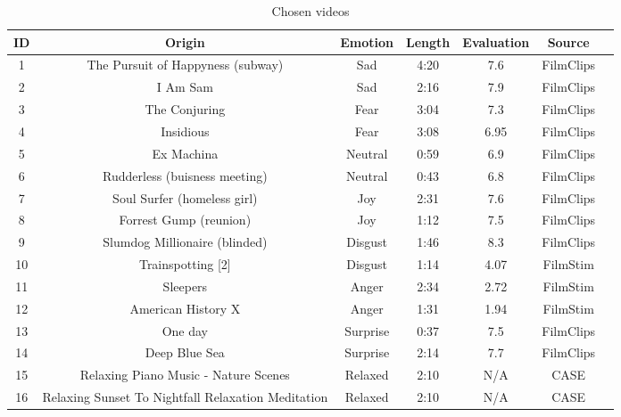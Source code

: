 \begin{table}[]
    \centering
    \begin{tabular}{|c|c|c|c|c|c|c|}
        \hline
        ID & Origin & Emotion & Length & Evaluation & Source\\ \hline
        1 & The Pursuit of Happyness (subway) & Sad & 4:20 & 7.6  & FilmClips \cite{FilmClips} \\ \hline
        2 & I Am Sam & Sad & 2:16 & 7.9  & FilmClips \cite{FilmClips}\\ \hline
        3 & The Conjuring & Fear & 3:04 & 7.3  & FilmClips \cite{FilmClips}  \\ \hline
        4 & Insidious & Fear & 3:08 & 6.95  & FilmClips \cite{FilmClips} \\ \hline
        5 & Ex Machina & Neutral & 0:59 & 6.9  & FilmClips \cite{FilmClips} \\ \hline
        6 & Rudderless (buisness meeting) & Neutral & 0:43 & 6.8  & FilmClips \cite{FilmClips} \\ \hline
        7 & Soul Surfer (homeless girl) & Joy & 2:31 & 7.6  & FilmClips \cite{FilmClips} \\ \hline
        8 & Forrest Gump (reunion) & Joy & 1:12 & 7.5  & FilmClips \cite{FilmClips} \\ \hline
        9 & Slumdog Millionaire (blinded) & Disgust & 1:46 & 8.3  & FilmClips \cite{FilmClips} \\ \hline
        10 &  Trainspotting [2] & Disgust & 1:14 & 4.07  & FilmStim \cite{FilmStim} \\ \hline
        11 & Sleepers & Anger & 2:34 & 2.72  & FilmStim \cite{FilmStim}  \\ \hline
        12 & American History X & Anger & 1:31 & 1.94  & FilmStim \cite{FilmStim} \\ \hline
        13 & One day & Surprise & 0:37 & 7.5 & FilmClips \cite{FilmClips}\\ \hline
        14 & Deep Blue Sea & Surprise & 2:14 & 7.7 & FilmClips \cite{FilmClips} \\ \hline
        15 & Relaxing Piano Music - Nature Scenes & Relaxed & 2:10 & N/A & CASE \cite{CaseData}  \\ \hline
        16 & Relaxing Sunset To Nightfall Relaxation Meditation & Relaxed & 2:10 & N/A & CASE \cite{CaseData} \\ \hline
    \end{tabular}
    \caption{Chosen videos}
    \label{tab:my_label}
\end{table}

